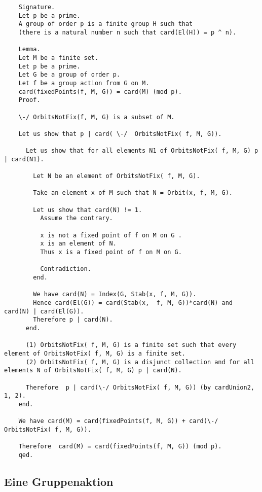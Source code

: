 \documentclass[a4paper,12pt]{scrartcl}
\begin{document}
\begin{lstlisting}
	Signature.
	Let p be a prime.
	A group of order p is a finite group H such that
	(there is a natural number n such that card(El(H)) = p ^ n).
	
	Lemma.
	Let M be a finite set.
	Let p be a prime.
	Let G be a group of order p.
	Let f be a group action from G on M.
	card(fixedPoints(f, M, G)) = card(M) (mod p).
	Proof.
	
	\-/ OrbitsNotFix(f, M, G) is a subset of M.
	
	Let us show that p | card( \-/  OrbitsNotFix( f, M, G)).
	
	  Let us show that for all elements N1 of OrbitsNotFix( f, M, G) p | card(N1).
	
		Let N be an element of OrbitsNotFix( f, M, G).
	
		Take an element x of M such that N = Orbit(x, f, M, G).
		
		Let us show that card(N) != 1.
		  Assume the contrary.
		   
		  x is not a fixed point of f on M on G .
		  x is an element of N.
		  Thus x is a fixed point of f on M on G.
	
		  Contradiction.
		end.
	
		We have card(N) = Index(G, Stab(x, f, M, G)).
		Hence card(El(G)) = card(Stab(x,  f, M, G))*card(N) and card(N) | card(El(G)).
		Therefore p | card(N).
	  end.
	
	  (1) OrbitsNotFix( f, M, G) is a finite set such that every element of OrbitsNotFix( f, M, G) is a finite set.
	  (2) OrbitsNotFix( f, M, G) is a disjunct collection and for all elements N of OrbitsNotFix( f, M, G) p | card(N).
	
	  Therefore  p | card(\-/ OrbitsNotFix( f, M, G)) (by cardUnion2, 1, 2).
	end.
	
	We have card(M) = card(fixedPoints(f, M, G)) + card(\-/ OrbitsNotFix( f, M, G)).
	
	Therefore  card(M) = card(fixedPoints(f, M, G)) (mod p).
	qed.

\end{lstlisting}

\subsection{Eine Gruppenaktion}
\end{document}
